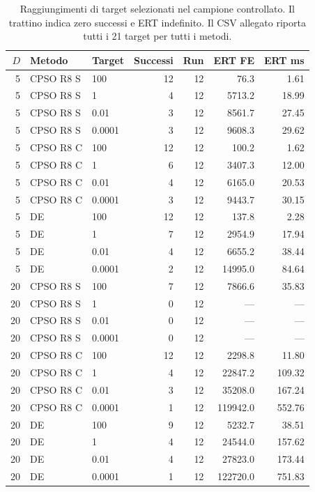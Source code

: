 \begin{table}[H]\centering\small
\caption{Raggiungimenti di target selezionati nel campione controllato. Il trattino indica zero successi e ERT indefinito. Il CSV allegato riporta tutti i 21 target per tutti i metodi.}\label{tab:targets}
\begin{tabular}{@{}rllrrrr@{}}
\toprule $D$ & Metodo & Target & Successi & Run & ERT FE & ERT ms\\\midrule
5 & CPSO R8 S & 100 & 12 & 12 & 76.3 & 1.61\\
5 & CPSO R8 S & 1 & 4 & 12 & 5713.2 & 18.99\\
5 & CPSO R8 S & 0.01 & 3 & 12 & 8561.7 & 27.45\\
5 & CPSO R8 S & 0.0001 & 3 & 12 & 9608.3 & 29.62\\
5 & CPSO R8 C & 100 & 12 & 12 & 100.2 & 1.62\\
5 & CPSO R8 C & 1 & 6 & 12 & 3407.3 & 12.00\\
5 & CPSO R8 C & 0.01 & 4 & 12 & 6165.0 & 20.53\\
5 & CPSO R8 C & 0.0001 & 3 & 12 & 9443.7 & 30.15\\
5 & DE & 100 & 12 & 12 & 137.8 & 2.28\\
5 & DE & 1 & 7 & 12 & 2954.9 & 17.94\\
5 & DE & 0.01 & 4 & 12 & 6655.2 & 38.44\\
5 & DE & 0.0001 & 2 & 12 & 14995.0 & 84.64\\
20 & CPSO R8 S & 100 & 7 & 12 & 7866.6 & 35.83\\
20 & CPSO R8 S & 1 & 0 & 12 & --- & ---\\
20 & CPSO R8 S & 0.01 & 0 & 12 & --- & ---\\
20 & CPSO R8 S & 0.0001 & 0 & 12 & --- & ---\\
20 & CPSO R8 C & 100 & 12 & 12 & 2298.8 & 11.80\\
20 & CPSO R8 C & 1 & 4 & 12 & 22847.2 & 109.32\\
20 & CPSO R8 C & 0.01 & 3 & 12 & 35208.0 & 167.24\\
20 & CPSO R8 C & 0.0001 & 1 & 12 & 119942.0 & 552.76\\
20 & DE & 100 & 9 & 12 & 5232.7 & 38.51\\
20 & DE & 1 & 4 & 12 & 24544.0 & 157.62\\
20 & DE & 0.01 & 4 & 12 & 27823.0 & 173.44\\
20 & DE & 0.0001 & 1 & 12 & 122720.0 & 751.83\\
\bottomrule\end{tabular}
\end{table}
